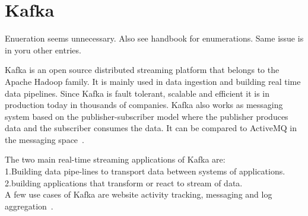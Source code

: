 \section{Kafka}

\begin{NOTE}
Enueration seems unnecessary. Also see handbook for enumerations. Same
issue is in yoru other entries.
\end{NOTE}

Kafka is an open source distributed streaming platform that belongs 
to the Apache Hadoop family. It is mainly used in data ingestion and 
building real time data pipelines. Since Kafka is fault tolerant, 
scalable and efficient it is in production today in thousands of 
companies. Kafka also works as messaging system based on the 
publisher-subscriber model where the publisher produces data and 
the subscriber consumes the data. It can be compared to ActiveMQ 
in the messaging space~\cite{hid-sp18-517-ApacheKafka}.


The two main real-time streaming applications of Kafka are: \\
1.Building data pipe-lines to transport data between systems of 
   applications.\\
2.building applications that transform or react to stream of data. \\

A few use cases of Kafka are website activity tracking, messaging 
and log aggregation~\cite{hid-sp18-517-ApacheKafka}.



